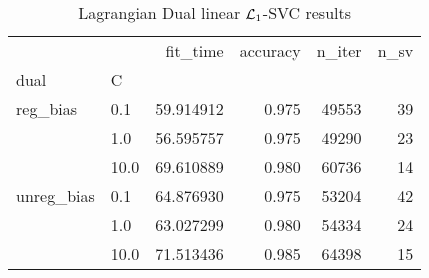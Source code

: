 \begin{table}[H]
\centering
\caption{Lagrangian Dual linear $\protect \mathcal{L}_1$-SVC results}
\label{linear_lagrangian_dual_l1_svc_cv_results}
\begin{tabular}{llrrrr}
\toprule
           &      &   fit\_time &  accuracy &  n\_iter &  n\_sv \\
dual & C &            &           &         &       \\
\midrule
reg\_bias & 0.1  &  59.914912 &     0.975 &   49553 &    39 \\
           & 1.0  &  56.595757 &     0.975 &   49290 &    23 \\
           & 10.0 &  69.610889 &     0.980 &   60736 &    14 \\
unreg\_bias & 0.1  &  64.876930 &     0.975 &   53204 &    42 \\
           & 1.0  &  63.027299 &     0.980 &   54334 &    24 \\
           & 10.0 &  71.513436 &     0.985 &   64398 &    15 \\
\bottomrule
\end{tabular}
\end{table}
